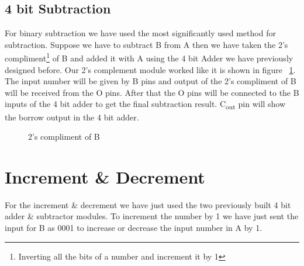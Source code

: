 \documentclass[a4paper, 12pt, twoside]{scrreprt}
\begin{document}
\subsection{4 bit Subtraction}
For binary subtraction we have used the most significantly used method for subtraction. Suppose we have to subtract B from A then we have taken the 2's compliment\footnote{Inverting all the bits of a number and increment it by 1} of B and added it with A using the 4 bit Adder we have previously designed before. Our 2's complement module worked like it is shown in figure ~\ref{compliment}. The input number will be given by B pins and output of the 2's compliment of B will be received from the O pins. After that the O pins will be connected to the B inputs of the 4 bit adder to get the final subtraction result. C\textsubscript{out} pin will show the borrow output in the 4 bit adder.
\begin{center}
\begin{figure}[h]
\begin{center}
\end{center} 
\caption{2's compliment of B \label{compliment}}
\end{figure}
\end{center}
\section{Increment \& Decrement}
For the increment \& decrement we have just used the two previously built 4 bit adder \& subtractor modules. To increment the number by 1 we have just sent the input for B as 0001 to increase or decrease the input number in A by 1.
\end{document}
